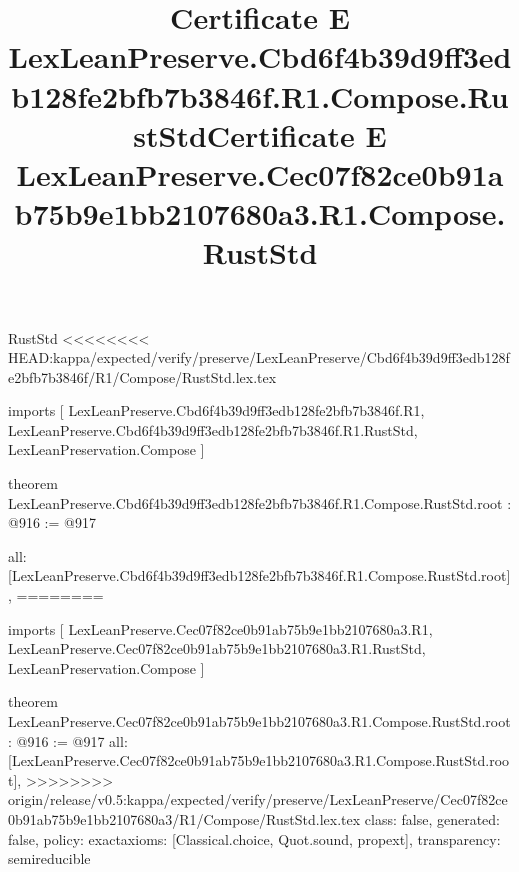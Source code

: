 \begin{lexlean}{RustStd}
<<<<<<<< HEAD:kappa/expected/verify/preserve/LexLeanPreserve/Cbd6f4b39d9ff3edb128fe2bfb7b3846f/R1/Compose/RustStd.lex.tex
\title{Certificate E LexLeanPreserve.Cbd6f4b39d9ff3edb128fe2bfb7b3846f.R1.Compose.RustStd}
\begin{coremodule}
imports [
  LexLeanPreserve.Cbd6f4b39d9ff3edb128fe2bfb7b3846f.R1,
  LexLeanPreserve.Cbd6f4b39d9ff3edb128fe2bfb7b3846f.R1.RustStd,
  LexLeanPreservation.Compose
]

theorem LexLeanPreserve.Cbd6f4b39d9ff3edb128fe2bfb7b3846f.R1.Compose.RustStd.root : @916 := @917 {
  all: [LexLeanPreserve.Cbd6f4b39d9ff3edb128fe2bfb7b3846f.R1.Compose.RustStd.root],
========
\title{Certificate E LexLeanPreserve.Cec07f82ce0b91ab75b9e1bb2107680a3.R1.Compose.RustStd}
\begin{coremodule}
imports [
  LexLeanPreserve.Cec07f82ce0b91ab75b9e1bb2107680a3.R1,
  LexLeanPreserve.Cec07f82ce0b91ab75b9e1bb2107680a3.R1.RustStd,
  LexLeanPreservation.Compose
]

theorem LexLeanPreserve.Cec07f82ce0b91ab75b9e1bb2107680a3.R1.Compose.RustStd.root : @916 := @917 {
  all: [LexLeanPreserve.Cec07f82ce0b91ab75b9e1bb2107680a3.R1.Compose.RustStd.root],
>>>>>>>> origin/release/v0.5:kappa/expected/verify/preserve/LexLeanPreserve/Cec07f82ce0b91ab75b9e1bb2107680a3/R1/Compose/RustStd.lex.tex
  class: false,
  generated: false,
  policy: exact{axioms: [Classical.choice, Quot.sound, propext]},
  transparency: semireducible
}


\end{coremodule}}
\end{coremodule}
\end{lexlean}
